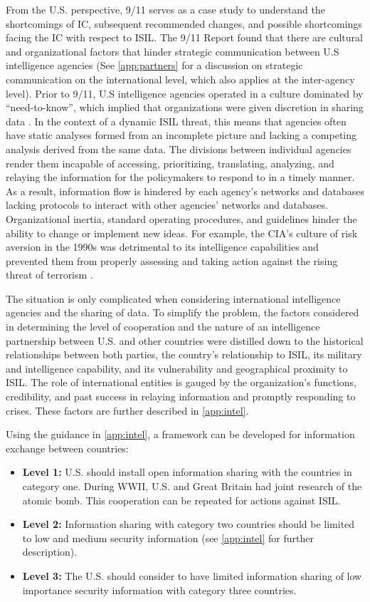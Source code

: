 \documentclass{report}
\begin{document}
From the U.S. perspective, 9/11 serves as a case study to understand the shortcomings of IC, subsequent recommended changes, and possible shortcomings facing the IC with respect to ISIL. The 9/11 Report found that there are cultural and organizational factors that hinder strategic communication between U.S intelligence agencies (See \autoref{app:partners} for a discussion on strategic communication on the international level, which also applies at the inter-agency level).  Prior to 9/11, U.S intelligence agencies operated in a culture dominated by \enquote{need-to-know}, which implied that organizations were given discretion in sharing data \cite{McConnell2008}. In the context of a dynamic ISIL threat, this means that agencies often have static analyses formed from an incomplete picture and lacking a competing analysis derived from the same data. The divisions between individual agencies render them incapable of accessing, prioritizing, translating, analyzing, and relaying the information for the policymakers to respond to in a timely manner. As a result, information flow is hindered by each agency's networks and databases lacking protocols to interact with other agencies' networks and databases.  Organizational inertia, standard operating procedures, and guidelines hinder the ability to change or implement new ideas. For example, the CIA's culture of risk aversion in the 1990s was detrimental to its intelligence capabilities and prevented them from properly assessing and taking action against the rising threat of terrorism \cite{Zegart2005}.

The situation is only complicated when considering international intelligence agencies and the sharing of data. To simplify the problem, the factors considered in determining the level of cooperation and the nature of an intelligence partnership between U.S. and other countries were distilled down to the historical relationships between both parties, the country's relationship to ISIL, its military and intelligence capability, and its vulnerability and geographical proximity to ISIL. The role of international entities is gauged by the organization's functions, credibility, and past success in relaying information and promptly responding to crises.  These factors are further described in \autoref{app:intel}. 

Using the guidance in \autoref{app:intel}, a framework can be developed for information exchange between countries: 

\begin{itemize}
  \item \textbf{Level 1:} U.S. should install open information sharing with the countries in category one. During WWII, U.S. and Great Britain had joint research of the atomic bomb. This cooperation can be repeated for actions against ISIL.
  \item \textbf{Level 2:} Information sharing with category two countries should be limited to low and medium security information (see \autoref{app:intel} for further description).  
  \item \textbf{Level 3:} The U.S. should consider to have limited information sharing of low importance security information with category three countries.  
\end{itemize}
\end{document}
